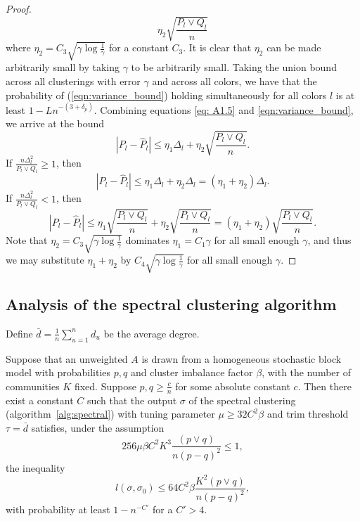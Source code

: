 \documentclass{article}
\begin{document}
\begin{proof}
$$\eta_2 \sqrt{ \frac{P_l \vee Q_l}{n} }$$
where $\eta_2 = C_3 \sqrt{\gamma \log \frac{1}{\gamma}}$ for a constant $C_3$. It is clear that $\eta_2$ can be made arbitrarily small by taking $\gamma$ to be arbitrarily small. Taking the union bound across all clusterings with error $\gamma$ and across all colors, we have that the probability of (\ref{eqn:variance_bound}) holding simultaneously for all colors $l$ is at least $1 - L n^{-(3+\delta_p)}$. Combining equations \eqref{eq: A1.5} and \eqref{eqn:variance_bound}, we arrive at the bound
\begin{equation}\label{eq: combine}
|P_l - \hat P_l| \leq \eta_1 \Delta_l + \eta_2 \sqrt{\frac{P_l \vee Q_l}{n}}.
\end{equation}
If $\frac{n\Delta_l^2}{P_l \vee Q_l} \geq 1$, then
\begin{equation}
|P_l - \hat P_l| \leq \eta_1 \Delta_l + \eta_2 \Delta_l = (\eta_1 + \eta_2) \Delta_l.
\end{equation}
If $\frac{n\Delta_l^2}{P_l \vee Q_l} < 1$, then
\begin{equation}
|P_l - \hat P_l| \leq \eta_1\sqrt{\frac{P_l \vee Q_l}{n}}+ \eta_2 \sqrt{\frac{P_l \vee Q_l}{n}} = (\eta_1 + \eta_2)\sqrt{\frac{P_l \vee Q_l}{n}}. 
\end{equation}
Note that $\eta_2 = C_3 \sqrt{\gamma \log \frac{1}{\gamma}}$ dominates $\eta_1 = C_1 \gamma$ for all small enough $\gamma$, and thus we may substitute $\eta_1+\eta_2$ by $C_4\sqrt{\gamma \log \frac{1}{\gamma}}$ for all small enough $\gamma$.
\end{proof}


\subsection{Analysis of the spectral clustering algorithm}
\label{appendix: spectral}
Define $\bar{d} = \frac{1}{n} \sum_{u=1}^n d_u$ be the average degree.

\begin{proposition}
\label{prop:spectral_analysis}
Suppose that an unweighted $A$ is drawn from a homogeneous stochastic block model with probabilities $p, q$ and cluster imbalance factor $\beta$, with the number of communities $K$ fixed. Suppose $p, q \geq \frac{c}{n}$ for some absolute constant $c$. Then there exist a constant $C$ such that the output $\sigma$ of the spectral clustering (algorithm~\ref{alg:spectral}) with tuning parameter $\mu \geq 32 C^2 \beta$ and trim threshold $\tau = \bar{d}$ satisfies, under the assumption
$$256 \mu \beta C^2 K^3 \frac{(p \vee q)}{n (p-q)^2} \leq 1,$$ 
the inequality
\[
l(\sigma, \sigma_0) \leq 64 C^2 \beta  \frac{K^2 (p \vee q) }{n (p-q)^2},
\]
with probability at least $1 - n^{-C'}$ for a $C' > 4$.
\end{proposition}
\end{document}
